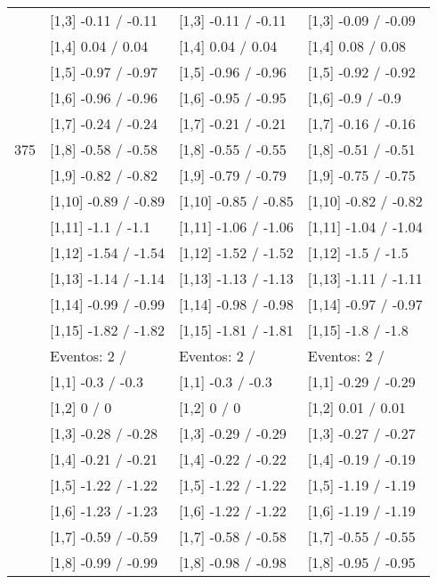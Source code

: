 \begin{table}
\begin{tabular}[t]{llll}
 & {}[1,3] -0.11  / -0.11 & {}[1,3] -0.11  / -0.11 & {}[1,3] -0.09  / -0.09\\
\addlinespace
 & {}[1,4] 0.04  / 0.04 & {}[1,4] 0.04  / 0.04 & {}[1,4] 0.08  / 0.08\\
 & {}[1,5] -0.97  / -0.97 & {}[1,5] -0.96  / -0.96 & {}[1,5] -0.92  / -0.92\\
 & {}[1,6] -0.96  / -0.96 & {}[1,6] -0.95  / -0.95 & {}[1,6] -0.9  / -0.9\\
 & {}[1,7] -0.24  / -0.24 & {}[1,7] -0.21  / -0.21 & {}[1,7] -0.16  / -0.16\\
375 & {}[1,8] -0.58  / -0.58 & {}[1,8] -0.55  / -0.55 & {}[1,8] -0.51  / -0.51\\
\addlinespace
 & {}[1,9] -0.82  / -0.82 & {}[1,9] -0.79  / -0.79 & {}[1,9] -0.75  / -0.75\\
 & {}[1,10] -0.89  / -0.89 & {}[1,10] -0.85  / -0.85 & {}[1,10] -0.82  / -0.82\\
 & {}[1,11] -1.1  / -1.1 & {}[1,11] -1.06  / -1.06 & {}[1,11] -1.04  / -1.04\\
 & {}[1,12] -1.54  / -1.54 & {}[1,12] -1.52  / -1.52 & {}[1,12] -1.5  / -1.5\\
 & {}[1,13] -1.14  / -1.14 & {}[1,13] -1.13  / -1.13 & {}[1,13] -1.11  / -1.11\\
\addlinespace
 & {}[1,14] -0.99  / -0.99 & {}[1,14] -0.98  / -0.98 & {}[1,14] -0.97  / -0.97\\
 & {}[1,15] -1.82  / -1.82 & {}[1,15] -1.81  / -1.81 & {}[1,15] -1.8  / -1.8\\
 & Eventos:  2 / & Eventos:  2 / & Eventos:  2 /\\
 & {}[1,1] -0.3  / -0.3 & {}[1,1] -0.3  / -0.3 & {}[1,1] -0.29  / -0.29\\
 & {}[1,2] 0  / 0 & {}[1,2] 0  / 0 & {}[1,2] 0.01  / 0.01\\
\addlinespace
 & {}[1,3] -0.28  / -0.28 & {}[1,3] -0.29  / -0.29 & {}[1,3] -0.27  / -0.27\\
 & {}[1,4] -0.21  / -0.21 & {}[1,4] -0.22  / -0.22 & {}[1,4] -0.19  / -0.19\\
 & {}[1,5] -1.22  / -1.22 & {}[1,5] -1.22  / -1.22 & {}[1,5] -1.19  / -1.19\\
 & {}[1,6] -1.23  / -1.23 & {}[1,6] -1.22  / -1.22 & {}[1,6] -1.19  / -1.19\\
 & {}[1,7] -0.59  / -0.59 & {}[1,7] -0.58  / -0.58 & {}[1,7] -0.55  / -0.55\\
\addlinespace
500 & {}[1,8] -0.99  / -0.99 & {}[1,8] -0.98  / -0.98 & {}[1,8] -0.95  / -0.95\\

\end{tabular}
\end{table}
